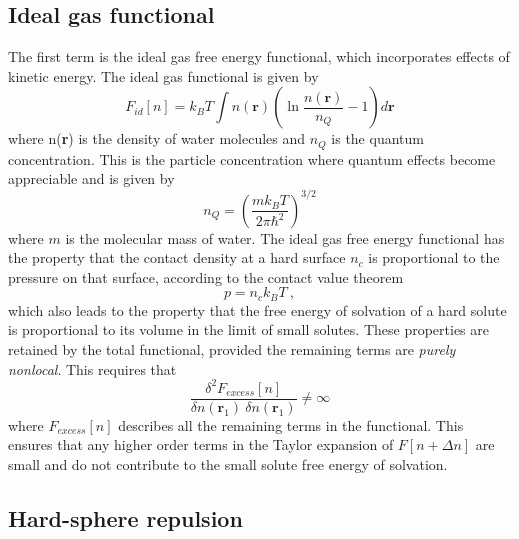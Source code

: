 \documentclass[letterpaper,twocolumn,amsmath,amssymb,prb]{revtex4-1}
\newcommand{\xx}{\textbf{r}}
\begin{document}
\subsection{Ideal gas functional}
The first term is the ideal gas free energy functional,
which incorporates effects of kinetic energy.  The ideal gas
functional is given by
\begin{equation}\label{idealgas}
  F_{id}[n] = k_B T \int n(\xx)\left( \ln{\frac{n(\xx)}{n_Q}} - 1\right) d\xx
\end{equation}
where n(\xx) is the density of water molecules and $n_Q$ is the quantum 
concentration. This is the particle concentration where quantum effects
become appreciable and is given by
\begin{equation}\label{quantumconcentration}
 n_Q =\left(\frac{mk_BT}{2\pi\hbar^2}\right)^{3/2}
\end{equation}
where $m$ is the molecular mass of water. The ideal gas free
energy functional has the property that the contact density at a hard
surface $n_c$ is proportional to the pressure on that surface,
according to the contact value theorem
\begin{equation}\label{contactvaluethm}
  p = n_c k_BT \:,
\end{equation}
which also leads to the property that the free energy of solvation of
a hard solute is proportional to its volume in the limit of small
solutes.  These properties are retained by the total functional,
provided the remaining terms are \emph{purely nonlocal}. This requires
that
\begin{equation}
 \frac{\delta^2F_{\textit{excess}}[n]}{\delta n(\xx_1)~\delta n(\xx_1)}\neq\infty
\end{equation}
where $F_{\textit{excess}}[n]$ describes all the remaining terms in the functional.
This ensures that any higher order terms in the Taylor expansion
of $F[n+\Delta n]$ are small and do not contribute to the small
solute free energy of solvation.


\subsection{Hard-sphere repulsion}
\end{document}
